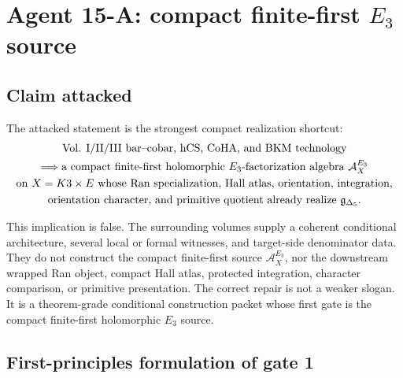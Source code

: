 \providecommand{\AEX}{\mathcal A^{E_3}_X}
\providecommand{\AX}{\mathcal A_X}
\providecommand{\Ran}{\operatorname{Ran}}
\providecommand{\Fact}{\mathsf{Fact}}
\providecommand{\Perf}{\operatorname{Perf}}
\providecommand{\CoHA}{\operatorname{CoHA}}
\providecommand{\Hall}{\operatorname{Hall}}
\providecommand{\Prim}{\operatorname{Prim}}
\providecommand{\Primprot}{\Prim_{\operatorname{prot}}}
\providecommand{\Spch}{\operatorname{Sp}^{\operatorname{ch}}}
\providecommand{\PhiFA}{\Phi^{\operatorname{FA}}}
\providecommand{\hCS}{\operatorname{hCS}}
\providecommand{\gDelta}{\mathfrak g_{\Delta_5}}
\providecommand{\DDelta}{\mathsf{Den}_{\Delta_5,E}}
\providecommand{\epsor}{\epsilon_o}
\providecommand{\nuDelta}{\nu_{\Delta_5}}
\providecommand{\sdim}{\operatorname{sdim}}

\section{Agent 15-A: compact finite-first \(E_3\) source}

\subsection{Claim attacked}

The attacked statement is the strongest compact realization shortcut:
\[
\begin{gathered}
\hbox{Vol. I/II/III bar--cobar, hCS, CoHA, and BKM technology}\\
\Longrightarrow
\hbox{a compact finite-first holomorphic \(E_3\)-factorization algebra }
\AEX\\
\hbox{on }X=K3\times E
\hbox{ whose Ran specialization, Hall atlas, orientation, integration,}\\
\hbox{orientation character, and primitive quotient already realize }
\gDelta .
\end{gathered}
\]

This implication is false.  The surrounding volumes supply a coherent
conditional architecture, several local or formal witnesses, and target-side
denominator data.  They do not construct the compact finite-first source
\(\AEX\), nor the downstream wrapped Ran object, compact Hall atlas,
protected integration, character comparison, or primitive presentation.  The
correct repair is not a weaker slogan.  It is a theorem-grade conditional
construction packet whose first gate is the compact finite-first
holomorphic \(E_3\) source.

\subsection{First-principles formulation of gate 1}

